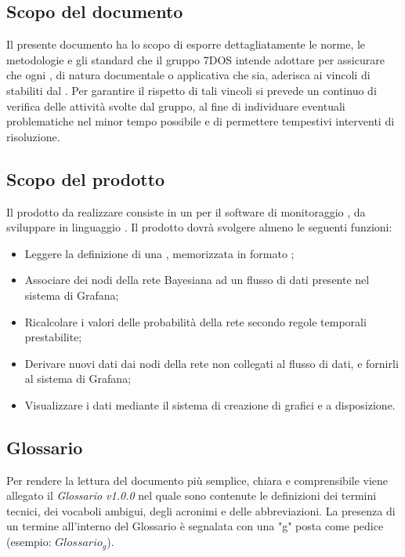 \subsection{Scopo del documento}
Il presente documento ha lo scopo di esporre dettagliatamente le norme, le metodologie e gli standard che il gruppo 7DOS intende adottare per assicurare che ogni , di natura documentale o applicativa che sia, aderisca ai vincoli di  stabiliti dal . Per garantire il rispetto di tali vincoli si prevede un continuo  di verifica delle attività svolte dal gruppo, al fine di individuare eventuali problematiche nel minor tempo possibile e di permettere tempestivi interventi di risoluzione.
\subsection{Scopo del prodotto}
Il prodotto da realizzare consiste in un  per il software di monitoraggio , da sviluppare in linguaggio . Il prodotto dovrà svolgere almeno le seguenti funzioni:
\begin{itemize}
	\item{Leggere la definizione di una , memorizzata in formato ;}
	\item{Associare dei nodi della rete Bayesiana ad un flusso di dati presente nel sistema di Grafana;}
	\item{Ricalcolare i valori delle probabilità della rete secondo regole temporali prestabilite;}
	\item{Derivare nuovi dati dai nodi della rete non collegati al flusso di dati, e fornirli al sistema di Grafana;}
	\item{Visualizzare i dati mediante il sistema di creazione di grafici e  a disposizione.}

\end{itemize}
	
\subsection{Glossario}
Per rendere la lettura del documento più semplice, chiara e comprensibile viene allegato il \emph{Glossario v1.0.0} nel quale sono contenute le definizioni dei termini tecnici, dei vocaboli ambigui, degli acronimi e delle abbreviazioni. La presenza di un termine all'interno del Glossario è segnalata con una "g" posta come pedice (esempio: $Glossario_{g}$).  
